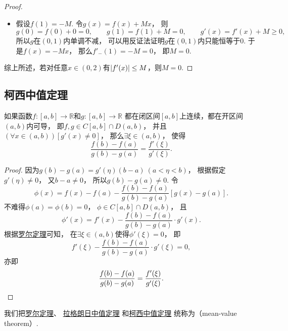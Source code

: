 \begin{example}
\begin{proof}
\begin{itemize}
	\item 假设\(f(1) = -M\).
	令\(g(x) = f(x) + M x\)，
	则\begin{equation*}
		g(0) = f(0) + 0 = 0,
		\qquad
		g(1) = f(1) + M = 0,
		\qquad
		g'(x) = f'(x) + M \geq 0,
	\end{equation*}
	所以\(g\)在\((0,1)\)内单调不减，
	可以用反证法证明\(g\)在\((0,1)\)内只能恒等于\(0\).
	于是\(f(x) = -M x\)，
	那么\(f'_-(1) = -M = 0\)，
	即\(M = 0\).
\end{itemize}
综上所述，若对任意\(x\in(0,2)\)有\(\abs{f'(x)} \leq M\)，则\(M = 0\).
\end{proof}
\end{example}

\subsection{柯西中值定理}
\begin{theorem}[柯西中值定理]\label{theorem:微分中值定理.柯西中值定理}
如果函数\(f\colon[a,b]\to\mathbb{R}\)和\(g\colon[a,b]\to\mathbb{R}\)
都在闭区间\([a,b]\)上连续，都在开区间\((a,b)\)内可导，
即\(f,g \in C[a,b] \cap D(a,b)\)，
并且\((\forall x\in(a,b))[g'(x) \neq 0]\)，
那么\(\exists\xi\in(a,b)\)，
使得\begin{equation}
	\frac{f(b)-f(a)}{g(b)-g(a)}=\frac{f'(\xi)}{g'(\xi)}.
\end{equation}
\begin{proof}
因为\(g(b)-g(a)=g'(\eta)(b-a)\ (a<\eta<b)\)，
根据假定\(g'(\eta)\neq0\)，
又\(b-a\neq0\)，
所以\(g(b)-g(a)\neq0\).
令\[
	\phi(x)=f(x)-f(a)-\frac{f(b)-f(a)}{g(b)-g(a)}[g(x)-g(a)].
\]
不难得\(\phi(a)=\phi(b)=0\)，
\(\phi\in C[a,b]\cap D(a,b)\)，
且\[
	\phi'(x)=f'(x)-\frac{f(b)-f(a)}{g(b)-g(a)}\cdot g'(x).
\]
根据\hyperref[theorem:微分中值定理.罗尔定理]{罗尔定理}可知，
在\(\exists\xi\in(a,b)\)使得\(\phi'(\xi)=0\)，
即\[
	f'(\xi)-\frac{f(b)-f(a)}{g(b)-g(a)}\cdot g'(\xi)=0,
\]
亦即\[
	\frac{f(b)-f(a)}{g(b)-g(a)}=\frac{f'(\xi)}{g'(\xi)}.
	\qedhere
\]
\end{proof}
\end{theorem}

我们把\hyperref[theorem:微分中值定理.罗尔定理]{罗尔定理}、
\hyperref[theorem:微分中值定理.拉格朗日中值定理]{拉格朗日中值定理}%
和\hyperref[theorem:微分中值定理.柯西中值定理]{柯西中值定理}%
统称为（mean-value theorem）.

